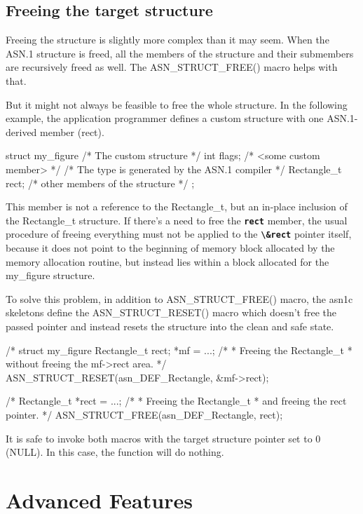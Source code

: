 \documentclass[english,oneside,12pt]{book}
\newcommand{\code}[1]{\texttt{\textbf{\lstinline{#1}}}}
\begin{document}
\section{\label{sec:Freeing-the-target}Freeing the target structure}

Freeing the structure is slightly more complex than it may seem.
When the ASN.1 structure is freed, all the members of the structure
and their submembers are recursively freed as well.
The ASN\_STRUCT\_FREE() macro helps with that.

But it might not always be feasible to free the whole structure.
In the following example, the application programmer defines a custom
structure with one ASN.1-derived member (rect).
\begin{codesample}
struct my_figure {       /* The custom structure */
    int flags;           /* <some custom member> */
    /* The type is generated by the ASN.1 compiler */
    Rectangle_t rect;
    /* other members of the structure */
};
\end{codesample}
This member is not a reference to the Rectangle\_t, but an in-place inclusion
of the Rectangle\_t structure.
If there's a need to free the \code{rect} member, the usual procedure of
freeing everything must not be applied to the \code{\&rect} pointer itself,
because it does not point to the beginning of memory block allocated by
the memory allocation routine, but instead lies within a block allocated for
the my\_figure structure.

To solve this problem, in addition to ASN\_STRUCT\_FREE() macro, the asn1c
skeletons define the ASN\_STRUCT\_RESET() macro which doesn't free the passed
pointer and instead resets the structure into the clean and safe state.
\begin{codesample}
/* %
struct my_figure {
    Rectangle_t rect;
} *mf = ...;
/*
 * Freeing the Rectangle_t
 * without freeing the mf->rect area.
 */
ASN_STRUCT_RESET(asn_DEF_Rectangle, &mf->rect);
  
/* %
Rectangle_t *rect = ...;
/*
 * Freeing the Rectangle_t
 * and freeing the rect pointer.
 */
ASN_STRUCT_FREE(asn_DEF_Rectangle, rect);
\end{codesample}
It is safe to invoke both macros with the target structure pointer
set to 0 (NULL). In this case, the function will do nothing.

\chapter{Advanced Features}
\end{document}
